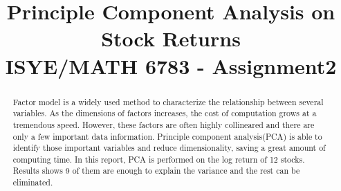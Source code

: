 \documentclass[conference]{IEEEtran}
\begin{document}
%
\title{\huge Principle Component Analysis on Stock Returns \\ {\large ISYE/MATH 6783 - Assignment2}}


\author{
}







\maketitle

\begin{abstract}
Factor model is a widely used method to characterize the relationship between several variables. As the dimensions of factors increases, the cost of computation grows at a tremendous speed. However, these factors are often highly collineared and there are only a few important data information. Principle component analysis(PCA) is able to identify those important variables and reduce dimensionality, saving a great amount of computing time. In this report, PCA is performed on the log return of 12 stocks. Results shows 9 of them are enough to explain the variance and the rest can be eliminated. 
\end{abstract}
\end{document}
